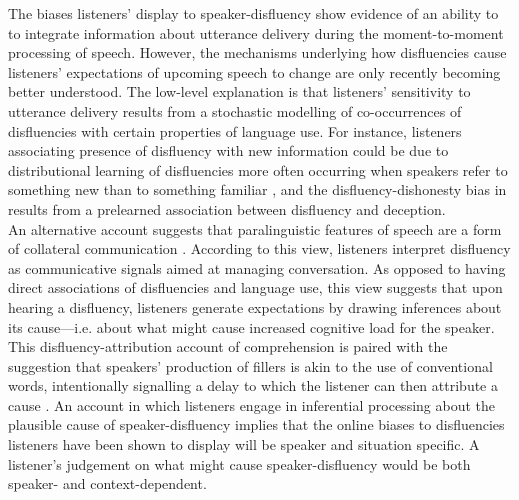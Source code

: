 \documentclass[man]{apa6}
\begin{document}
The biases listeners' display to speaker-disfluency show evidence of an ability to to integrate information about utterance delivery during the moment-to-moment processing of speech. 
However, the mechanisms underlying how disfluencies cause listeners' expectations of upcoming speech to change are only recently becoming better understood. 
The low-level explanation is that listeners' sensitivity to utterance delivery results from a stochastic modelling of co-occurrences of disfluencies with certain properties of language use. 
For instance, listeners associating presence of disfluency with new information could be due to distributional learning of disfluencies more often occurring when speakers refer to something new than to something familiar \citep{Arnold2004, Barr2001}, and the disfluency-dishonesty bias in \citet{Loy2016} results from a prelearned association between disfluency and deception.\\

An alternative account suggests that paralinguistic features of speech are a form of collateral communication \citep{Clark1996}. 
According to this view, listeners interpret disfluency as communicative signals aimed at managing conversation. 
As opposed to having direct associations of disfluencies and language use, this view suggests that upon hearing a disfluency, listeners generate expectations by drawing inferences about its cause---i.e. about what might cause increased cognitive load for the speaker. 
This disfluency-attribution account of comprehension is paired with the suggestion that speakers' production of fillers is akin to the use of conventional words, intentionally signalling a delay to which the listener can then attribute a cause \citep{Clark2002}. 
An account in which listeners engage in inferential processing about the plausible cause of speaker-disfluency implies that the online biases to disfluencies listeners have been shown to display will be speaker and situation specific. 
A listener's judgement on what might cause speaker-disfluency would be both speaker- and context-dependent.\\
\end{document}
